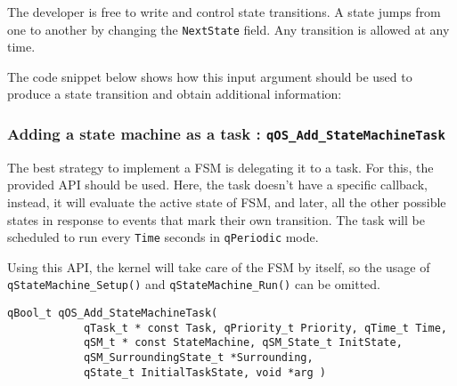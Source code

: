 The developer is free to write and control state transitions. A state jumps from one to another by changing the \lstinline{NextState} field. Any transition is allowed at any time.

The code snippet below shows how this input argument should be used to produce a state transition and obtain additional information: 
\medskip



\subsubsection{Adding a state machine as a task : \texorpdfstring{\lstinline{qOS_Add_StateMachineTask}}{qOS_Add_StateMachineTask} } \label{statemachinetask}
The best strategy to implement a FSM is delegating it to a task. For this, the provided  API should be used. Here, the task doesn't have a specific callback, instead, it will evaluate the active state of FSM, and later, all the other possible states in response to events that mark their own transition. The task will be scheduled to run every \lstinline{Time} seconds in \lstinline{qPeriodic} mode. 

Using this API, the kernel will take care of the FSM by itself, so the usage of \lstinline{qStateMachine_Setup()} and \lstinline{qStateMachine_Run()} can be omitted. 
\medskip

\begin{lstlisting}[style=CStyle]
qBool_t qOS_Add_StateMachineTask( 
            qTask_t * const Task, qPriority_t Priority, qTime_t Time,
            qSM_t * const StateMachine, qSM_State_t InitState, 
            qSM_SurroundingState_t *Surrounding, 
            qState_t InitialTaskState, void *arg )
\end{lstlisting}

